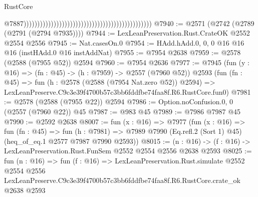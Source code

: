 \begin{lexlean}{RustCore}
\begin{coremodule}
                                                                                                  @7887)))))))))))))))))))))))))))))))))))))))))))))))
@7940 := @2571 (@2742 (@2789 (@2791 (@2794 @7935))))
@7944 := LexLeanPreservation.Rust.CrateOK @2552 @2554 @2556
@7945 := Nat.casesOn.{0}
@7954 := HAdd.hAdd.{0, 0, 0} @16 @16 @16 (instHAdd.{0} @16 instAddNat)
@7955 := @7954 @2638
@7959 := @2578 (@2588 (@7955 @52)) @2594
@7960 := @7954 @2636
@7977 := @7945
    (fun (y : @16) => (fn : @45) -> (h : @7959) -> @2557 (@7960 @52))
    @2593
    (fun (fn : @45) =>
    fun (h : @2578 (@2588 (@7954 Nat.zero @52)) @2594) =>
    LexLeanPreserve.C9c3e39f4700b57c3bb6fddfbe74faa8f.R6.RustCore.fun0)
@7981 := @2578 (@2588 (@7955 @22)) @2594
@7986 := Option.noConfusion.{0, 0} (@2557 (@7960 @22)) @45
@7987 := @983 @45
@7989 := @7986 @7987 @45
@7990 := @2592 @2638
@8007 := fun (x : @16) =>
  @7977
    (fun (x : @16) =>
    fun (fn : @45) =>
    fun (h : @7981) =>
    @7989 @7990 (Eq.refl.{2} (Sort 1) @45) (heq_of_eq.{1} @2577 @7987 @7990 @2593))
@8015 := (n : @16) -> (f : @16) -> LexLeanPreservation.Rust.FunSem @2552 @2554 @2556 @2638 @2593
@8025 := fun (n : @16) =>
  fun (f : @16) =>
  LexLeanPreservation.Rust.simulate
    @2552
    @2554
    @2556
    LexLeanPreserve.C9c3e39f4700b57c3bb6fddfbe74faa8f.R6.RustCore.crate_ok
    @2638
    @2593
\end{coremodule}
\end{lexlean}

